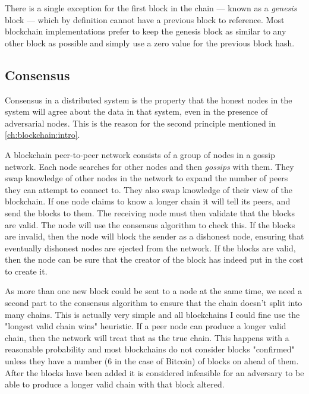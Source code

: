 There is a single exception for the first block in the chain --- known as a \emph{genesis} block --- which by definition cannot have a previous block to reference. Most blockchain implementations prefer to keep the genesis block as similar to any other block as possible and simply use a zero value for the previous block hash.


\subsection{Consensus}
\label{ch:blockchain:structure:consensus}

Consensus in a distributed system is the property that the honest nodes in the system will agree about the data in that system, even in the presence of adversarial nodes. This is the reason for the second principle mentioned in \autoref{ch:blockchain:intro}.

A blockchain peer-to-peer network consists of a group of nodes in a gossip network. Each node searches for other nodes and then \emph{gossips} with them. They swap knowledge of other nodes in the network to expand the number of peers they can attempt to connect to. They also swap knowledge of their view of the blockchain. If one node claims to know a longer chain it will tell its peers, and send the blocks to them. The receiving node must then validate that the blocks are valid. The node will use the consensus algorithm to check this. If the blocks are invalid, then the node will block the sender as a dishonest node, ensuring that eventually dishonest nodes are ejected from the network. If the blocks are valid, then the node can be sure that the creator of the block has indeed put in the cost to create it.

As more than one new block could be sent to a node at the same time, we need a second part to the consensus algorithm to ensure that the chain doesn't split into many chains. This is actually very simple and all blockchains I could fine use the "longest valid chain wins" heuristic. If a peer node can produce a longer valid chain, then the network will treat that as the true chain. This happens with a reasonable probability and most blockchains do not consider blocks "confirmed" unless they have a number (6 in the case of Bitcoin) of blocks on ahead of them. After the blocks have been added it is considered infeasible for an adversary to be able to produce a longer valid chain with that block altered.

